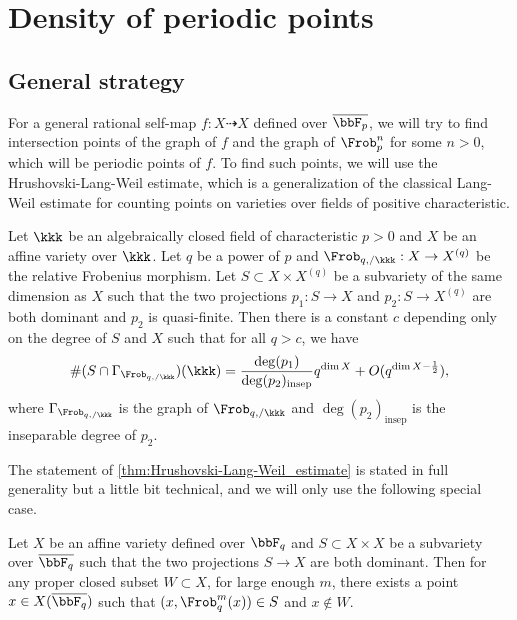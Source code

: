 \section{Density of periodic points}


\subsection{General strategy}


For a general rational self-map $f: X \dashrightarrow X$ defined over $\overline{\bbF_p}$, we will try to find intersection points of the graph of $f$ and the graph of $\Frob_p^n$ for some $n > 0$, which will be periodic points of $f$.
To find such points, we will use the Hrushovski-Lang-Weil estimate, which is a generalization of the classical Lang-Weil estimate for counting points on varieties over fields of positive characteristic.

\begin{theorem}\label{thm:Hrushovski-Lang-Weil_estimate}
	Let $\kkk$ be an algebraically closed field of characteristic $p > 0$ and $X$ be an affine variety over $\kkk$.
	Let $q$ be a power of $p$ and $\Frob_{q,/\kkk}: X \to X^{(q)}$ be the relative Frobenius morphism.
	Let $S \subset X \times X^{(q)}$ be a subvariety of the same dimension as $X$ such that
	the two projections $p_1: S \to X$ and $p_2: S \to X^{(q)}$ are both dominant and $p_2$ is quasi-finite.
	Then there is a constant $c$ depending only on the degree of $S$ and $X$ such that for all $q > c$, we have
	\[ \# (S \cap \Gamma_{\Frob_{q,/\kkk}})(\kkk) = \frac{\deg(p_1)}{\deg(p_2)_{\mathrm{insep}}} q^{\dim X} + O(q^{\dim X - \frac{1}{2}}), \]
	where $\Gamma_{\Frob_{q,/\kkk}}$ is the graph of $\Frob_{q,/\kkk}$ and $\deg(p_2)_{\mathrm{insep}}$ is the inseparable degree of $p_2$.
\end{theorem}

The statement of \cref{thm:Hrushovski-Lang-Weil_estimate} is stated in full generality but a little bit technical, and we will only use the following special case.

\begin{lemma}
	Let $X$ be an affine variety defined over $\bbF_q$ and $S \subset X \times X$ be a subvariety over $\overline{\bbF_q}$ such that the two projections $S \to X$ are both dominant.
	Then for any proper closed subset $W \subset X$, for large enough $m$, there exists a point $x \in X(\overline{\bbF_q})$ such that $(x, \Frob_q^m(x)) \in S$ and $x \notin W$.
\end{lemma}

